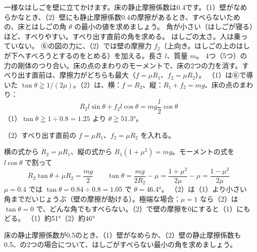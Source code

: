 \begin{phreidai}
\label{ph:力-5:ex6}一様なはしごを壁に立てかけます。床の静止摩擦係数は0.4です。（1）壁がなめらかなとき、（2）壁にも静止摩擦係数0.4の摩擦があるとき、すべらないための、床とはしごの角 $\theta$ の最小の値を求めましょう。
\phbamen
角が小さい（はしごが寝る）ほど、すべりやすい。すべり出す直前の角を求める。
\phmushi
はしごの太さ。人は乗っていない。
\phzu
⑥の図の力に、（2）では壁の摩擦力 $f_2$（上向き。はしごの上のはしが下へすべろうとするのをとめる）を加える。長さ $l$、質量 $m$。
\phriyu
4つ（5つ）の力の剛体のつり合い。床の点のまわりのモーメントで、床の2つの力を消す。すべり出す直前は、摩擦力がどちらも最大（$f=\mu R_1$、$f_2=\mu R_2$）。
\phtateru
（1）は⑥で導いた $\tan\theta\geqq1/(2\mu)$。（2）は、横：$f=R_2$、縦：$R_1+f_2=mg$、床の点のまわり：
\[ R_2l\sin\theta+f_2l\cos\theta=mg\frac{l}{2}\cos\theta \]
\phtoku
（1）$\tan\theta\geqq1\div 0.8=1.25$ より $\theta\geqq51.3°$。\par
（2）すべり出す直前の $f=\mu R_1$、$f_2=\mu R_2$ を入れる。\par
横の式から $R_2=\mu R_1$、縦の式から $R_1(1+\mu^2)=mg$。モーメントの式を $l\cos\theta$ で割って
\[ R_2\tan\theta+\mu R_2=\frac{mg}{2}\qquad \tan\theta=\frac{mg}{2R_2}-\mu=\frac{1+\mu^2}{2\mu}-\mu=\frac{1-\mu^2}{2\mu} \]
$\mu=0.4$ では $\tan\theta=0.84\div 0.8=1.05$ で $\theta=46.4°$。
\phtashikame
（2）は（1）より小さい角までだいじょうぶ（壁の摩擦が助ける）。\quad 極端な場合：$\mu=1$ なら（2）は $\tan\theta=0$ で、どんな角でもすべらない。（2）で壁の摩擦を0にすると（1）にもどる。
\kotae （1）約51°\quad（2）約46°
\end{phreidai}
\begin{jibun}
床の静止摩擦係数が0.5のとき、（1）壁がなめらか、（2）壁の静止摩擦係数も0.5、の2つの場合について、はしごがすべらない最小の角を求めましょう。
\end{jibun}


